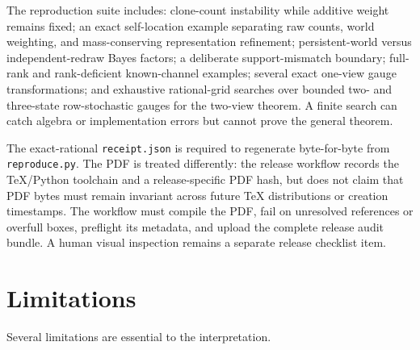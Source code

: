 \documentclass[11pt]{article}
\begin{document}
The reproduction suite includes: clone-count instability while additive weight remains fixed; an exact self-location example separating raw counts, world weighting, and mass-conserving representation refinement; persistent-world versus independent-redraw Bayes factors; a deliberate support-mismatch boundary; full-rank and rank-deficient known-channel examples; several exact one-view gauge transformations; and exhaustive rational-grid searches over bounded two- and three-state row-stochastic gauges for the two-view theorem. A finite search can catch algebra or implementation errors but cannot prove the general theorem.

The exact-rational \texttt{receipt.json} is required to regenerate byte-for-byte from \texttt{reproduce.py}. The PDF is treated differently: the release workflow records the TeX/Python toolchain and a release-specific PDF hash, but does not claim that PDF bytes must remain invariant across future TeX distributions or creation timestamps. The workflow must compile the PDF, fail on unresolved references or overfull boxes, preflight its metadata, and upload the complete release audit bundle. A human visual inspection remains a separate release checklist item.

\section{Limitations}
Several limitations are essential to the interpretation.
\end{document}
